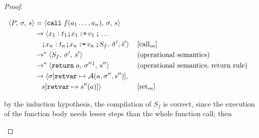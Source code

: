 \documentclass{article}
\begin{document}
\begin{proof}
\begin{itemize}
    \[
      \begin{aligned}
      \langle P,\, \sigma,\, s \rangle
      &=\langle \texttt{call}\; f(a_1 \dots, a_n),\, \sigma,\, s \rangle \\
      &\rightarrow \langle x_1 : t_1 \texttt{;} x_1 \,\texttt{:=}\, v_1\, \texttt{;} \dots \\
      &\quad \texttt{;} x_n : t_n \texttt{;} x_n \,\texttt{:=}\, v_n\, \texttt{;} S_f,\, \tilde{\sigma}', \tilde{s}' \rangle
      && [\text{call}_{\text{os}}]   \\
      &\rightarrow^\ast \langle S_f,\, \sigma' ,\, s' \rangle
      && (\text{operational semantics})   \\
      &\rightarrow^\ast \langle \texttt{return}\; a,\, \sigma'' \footnotemark ,\, s'' \rangle
      && (\text{operational semantics},\, \text{return rule})   \\
      &\rightarrow \langle \sigma[\texttt{retvar} \mapsto \mathcal{A}(a, \sigma'', s'')],\; \\
      &\quad s[\texttt{retvar} \mapsto s''(a)] \rangle
      && [\text{ret}_{\text{os}}] \\
      \end{aligned}
  \]

by the induction hypothesis, the compilation of $S_f$ is correct, since the execution of the function body needs lesser steps than the whole function call; then


\end{itemize}
\end{proof}
\end{document}
